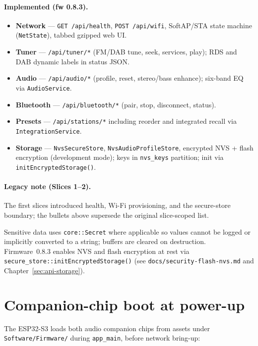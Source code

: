 \paragraph{Implemented (fw 0.8.3).}
\begin{itemize}
  \item \textbf{Network} --- \texttt{GET /api/health}, \texttt{POST /api/wifi},
        SoftAP/STA state machine (\texttt{NetState}), tabbed gzipped web UI.
  \item \textbf{Tuner} --- \texttt{/api/tuner/*} (FM/DAB tune, seek, services,
        play); RDS and DAB dynamic labels in status JSON.
  \item \textbf{Audio} --- \texttt{/api/audio/*} (profile, reset, stereo/bass
        enhance); six-band EQ via \texttt{AudioService}.
  \item \textbf{Bluetooth} --- \texttt{/api/bluetooth/*} (pair, stop, disconnect,
        status).
  \item \textbf{Presets} --- \texttt{/api/stations/*} including reorder and
        integrated recall via \texttt{IntegrationService}.
  \item \textbf{Storage} --- \texttt{NvsSecureStore}, \texttt{NvsAudioProfileStore},
        encrypted NVS + flash encryption (development mode); keys in
        \texttt{nvs\_keys} partition; init via \texttt{initEncryptedStorage()}.
\end{itemize}

\paragraph{Legacy note (Slices 1--2).}
The first slices introduced health, Wi-Fi provisioning, and the secure-store
boundary; the bullets above supersede the original slice-scoped list.

Sensitive data uses \texttt{core::Secret} where applicable so values cannot
be logged or implicitly converted to a string; buffers are cleared on
destruction. Firmware~0.8.3 enables NVS and flash encryption at rest via
\texttt{secure\_store::initEncryptedStorage()} (see
\texttt{docs/security-flash-nvs.md} and Chapter~\ref{sec:api-storage}).

\section{Companion-chip boot at power-up}
\label{sec:fw-chip-boot}

The ESP32-S3 loads both audio companion chips from assets under
\texttt{Software/Firmware/} during \texttt{app\_main}, before network
bring-up:

